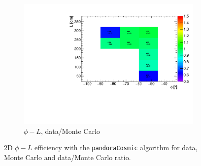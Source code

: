 \documentclass[a4paper]{scrartcl}
\begin{document}
\begin{figure}[htbp]
\begin{center}
\begin{subfigure}{0.52\textwidth}
    \includegraphics[width=\linewidth]{figures/ratio_phi_l.pdf}
    \caption{$\phi - L$, data/Monte Carlo}\label{fig:2d_cry_ratio_3}
  \end{subfigure}
  \caption{2D $\phi - L$ efficiency with the \texttt{pandoraCosmic} algorithm for data, Monte Carlo and data/Monte Carlo ratio.} \label{fig:cry_mc_2d_3}
\end{center}
\end{figure}
\end{document}
